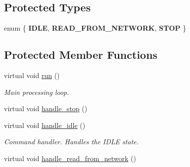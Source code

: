 \subsection*{Protected Types}
\begin{DoxyCompactItemize}
\item 
enum \{ {\bfseries IDLE}, 
{\bfseries READ\_\-FROM\_\-NETWORK}, 
{\bfseries STOP}
 \}
\end{DoxyCompactItemize}
\subsection*{Protected Member Functions}
\begin{DoxyCompactItemize}
\item 
\hypertarget{class_net_reader_af770f94a75655fc02489c9cb1f778181}{
virtual void \hyperlink{class_net_reader_af770f94a75655fc02489c9cb1f778181}{run} ()}
\label{class_net_reader_af770f94a75655fc02489c9cb1f778181}

\begin{DoxyCompactList}\small\item\em Main processing loop. \end{DoxyCompactList}\item 
virtual void \hyperlink{class_net_reader_a6b81e13eba7624570bfd0ed90874069c}{handle\_\-stop} ()
\item 
\hypertarget{class_net_reader_a13ec87275d0da80672ca1b6db0d8db01}{
virtual void \hyperlink{class_net_reader_a13ec87275d0da80672ca1b6db0d8db01}{handle\_\-idle} ()}
\label{class_net_reader_a13ec87275d0da80672ca1b6db0d8db01}

\begin{DoxyCompactList}\small\item\em Command handler. Handles the IDLE state. \end{DoxyCompactList}\item 
virtual void \hyperlink{class_net_reader_adff36260184f5d1207e298574a41becb}{handle\_\-read\_\-from\_\-network} ()
\end{DoxyCompactItemize}
